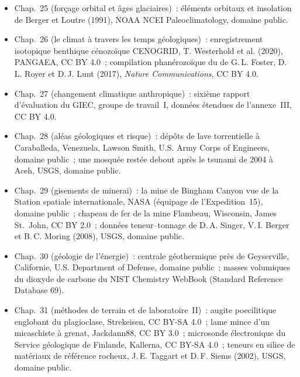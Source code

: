 \begin{itemize}
  \item Chap.~25 (forçage orbital et âges glaciaires)~: éléments orbitaux et insolation de Berger et Loutre (1991), NOAA NCEI Paleoclimatology, domaine public.
  \item Chap.~26 (le climat à travers les temps géologiques)~: enregistrement isotopique benthique cénozoïque CENOGRID, T. Westerhold et al. (2020), PANGAEA, CC BY 4.0~; compilation phanérozoïque du  de G.\,L. Foster, D.\,L. Royer et D.\,J. Lunt (2017), \emph{Nature Communications}, CC BY 4.0.
  \item Chap.~27 (changement climatique anthropique)~: sixième rapport d'évaluation du GIEC, groupe de travail~I, données étendues de l'annexe~III, CC BY 4.0.
  \item Chap.~28 (aléas géologiques et risque)~: dépôts de lave torrentielle à Caraballeda, Venezuela, Lawson Smith, U.S. Army Corps of Engineers, domaine public~; une mosquée restée debout après le tsunami de 2004 à Aceh, USGS, domaine public.
  \item Chap.~29 (gisements de minerai)~: la mine de Bingham Canyon vue de la Station spatiale internationale, NASA (équipage de l'Expedition~15), domaine public~; chapeau de fer de la mine Flambeau, Wisconsin, James St.~John, CC BY 2.0~; données teneur--tonnage de D.\,A. Singer, V.\,I. Berger et B.\,C. Moring (2008), USGS, domaine public.
  \item Chap.~30 (géologie de l'énergie)~: centrale géothermique près de Geyserville, Californie, U.S. Department of Defense, domaine public~; masses volumiques du dioxyde de carbone du NIST Chemistry WebBook (Standard Reference Database 69).
  \item Chap.~31 (méthodes de terrain et de laboratoire~II)~: augite poecilitique englobant du plagioclase, Strekeisen, CC BY-SA 4.0~; lame mince d'un micaschiste à grenat, Jackdann88, CC BY 3.0~; microsonde électronique du Service géologique de Finlande, Kallerna, CC BY-SA 4.0~; teneurs en silice de matériaux de référence rocheux, J.\,E. Taggart et D.\,F. Siems (2002), USGS, domaine public.
\end{itemize}
